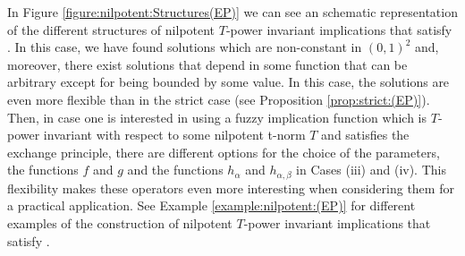 In Figure \ref{figure:nilpotent:Structures(EP)} we can see an schematic representation of the different structures of nilpotent $T$-power invariant implications that satisfy \EP. In this case, we have found solutions which are non-constant in $(0,1)^2$ and, moreover, there exist solutions that depend in some function that can be arbitrary except for being bounded by some value. In this case, the solutions are even more flexible than in the strict case (see Proposition \ref{prop:strict:(EP)}). Then, in case one is interested in using a fuzzy implication function which is $T$-power invariant with respect to some nilpotent t-norm $T$ and satisfies the exchange principle, there are different options for the choice of the parameters, the functions $f$ and $g$ and the functions $h_{\alpha}$ and $h_{\alpha,\beta}$ in Cases (iii) and (iv). This flexibility makes these operators even more interesting when considering them for a practical application.  See Example \ref{example:nilpotent:(EP)} for different examples of the construction of nilpotent $T$-power invariant implications that satisfy \EP.
